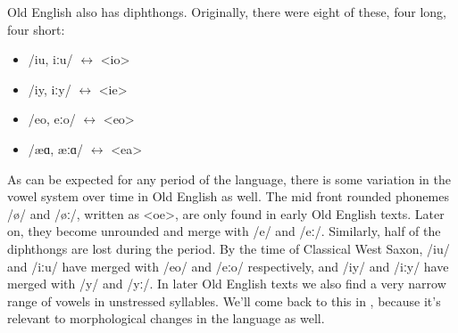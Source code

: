 Old English also has diphthongs. Originally, there were eight of these, four long, four short: 

\begin{itemize}
    \item /iu, iːu/ $\leftrightarrow$ <io>
    \item /iy, iːy/ $\leftrightarrow$ <ie>
    \item /eo, eːo/ $\leftrightarrow$ <eo>
    \item /æɑ, æːɑ/ $\leftrightarrow$ <ea>
\end{itemize}

\noindent As can be expected for any period of the language, there is some variation in the vowel system over time in Old English as well. The mid front rounded phonemes /ø/ and /øː/, written as <oe>, are only found in early Old English texts. Later on, they become unrounded and merge with /e/ and /eː/. Similarly, half of the diphthongs are lost during the period. By the time of Classical West Saxon, /iu/ and /iːu/ have merged with /eo/ and /eːo/ respectively, and /iy/ and /iːy/ have merged with /y/ and /yː/. In later Old English texts we also find a very narrow range of vowels in unstressed syllables. We'll come back to this in , because it's relevant to morphological changes in the language as well.


